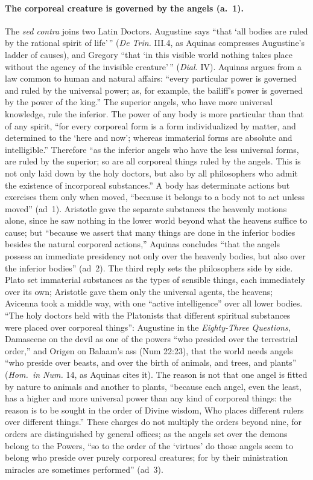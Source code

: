\paragraph{The corporeal creature is governed by the angels (a.~1).} The
\emph{sed contra} joins two Latin Doctors. Augustine says ``that `all
bodies are ruled by the rational spirit of life'\,'' (\emph{De Trin.}
III.4, as Aquinas compresses Augustine's ladder of causes), and Gregory ``that `in this
visible world nothing takes place without the agency of the invisible
creature'\,'' (\emph{Dial.} IV). Aquinas argues from a law common to human
and natural affairs: ``every particular power is governed and ruled by the
universal power; as, for example, the bailiff's power is governed by the
power of the king.'' The superior angels, who have more universal
knowledge, rule the inferior. The power of any body is more particular than
that of any spirit, ``for every corporeal form is a form individualized by
matter, and determined to the `here and now'; whereas immaterial forms are
absolute and intelligible.'' Therefore ``as the inferior angels who have the
less universal forms, are ruled by the superior; so are all corporeal
things ruled by the angels. This is not only laid down by the holy doctors,
but also by all philosophers who admit the existence of incorporeal
substances.'' A body has determinate actions but exercises them only when
moved, ``because it belongs to a body not to act unless moved'' (ad~1).
Aristotle gave the separate substances the heavenly motions alone, since
he saw nothing in the lower world beyond what the heavens suffice to
cause; but ``because we assert that many things are done in the inferior
bodies besides the natural corporeal actions,'' Aquinas concludes ``that
the angels possess an immediate presidency not only over the heavenly
bodies, but also over the inferior bodies'' (ad~2). The third reply sets
the philosophers side by side. Plato set immaterial substances as the
types of sensible things, each immediately over its own; Aristotle gave
them only the universal agents, the heavens; Avicenna took a middle way,
with one ``active intelligence'' over all lower bodies. ``The holy doctors
held with the Platonists that different spiritual substances were placed
over corporeal things'': Augustine in the \emph{Eighty-Three Questions},
Damascene on the devil as one of the powers ``who presided over the
terrestrial order,'' and Origen on Balaam's ass (Num 22:23), that the world
needs angels ``who preside over beasts, and over the birth of animals, and
trees, and plants'' (\emph{Hom.\ in Num.} 14, as Aquinas cites it). The
reason is not that one angel is fitted by nature to animals and another to
plants, ``because each angel, even the least, has a higher and more
universal power than any kind of corporeal things: the reason is to be
sought in the order of Divine wisdom, Who places different rulers over
different things.'' These charges do not multiply the orders beyond nine,
for orders are distinguished by general offices; as the angels set over
the demons belong to the Powers, ``so to the order of the `virtues' do those
angels seem to belong who preside over purely corporeal creatures; for by
their ministration miracles are sometimes performed'' (ad~3).

